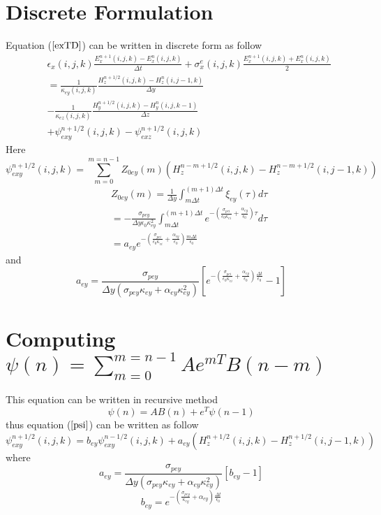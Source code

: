 \documentclass[a4paper,10pt]{article}
\begin{document}
\section{Discrete Formulation}
Equation ($\ref{exTD}$) can be written in discrete form as follow
\begin{eqnarray}
&&\epsilon_{x}(i,j,k)\frac{E^{n+1}_{x}(i,j,k)-E^{n}_{x}(i,j,k)}{\Delta t}
+\sigma^{e}_{x}(i,j,k)\frac{E^{n+1}_{x}(i,j,k)+E^{n}_{x}(i,j,k)}{2}\nonumber\\
&&=\frac{1}{\kappa_{e y}(i,j,k)}\frac{H^{n+1/2}_{z}(i,j,k)-H^{n}_{z}(i,j-1,k)}{\Delta y}\nonumber\\
&&-\frac{1}{\kappa_{e z}(i,j,k)}\frac{H^{n+1/2}_{y}(i,j,k)-H^{n}_{y}(i,j,k-1)}{\Delta z}\nonumber\\
&&+\psi^{n+1/2}_{e x y}(i,j,k)-\psi^{n+1/2}_{e x z}(i,j,k)
\end{eqnarray}
Here 
\begin{equation}\label{psi}
\psi^{n+1/2}_{e x y}(i,j,k)=\sum^{m=n-1}_{m=0}Z_{0 e y}(m)\left(H^{n-m+1/2}_{z}(i,j,k)-H^{n-m+1/2}_{z}(i,j-1,k)\right)
\end{equation}
\begin{eqnarray}
&&Z_{0 e y}(m)=\frac{1}{\Delta y}\int^{(m+1)\Delta t}_{m\Delta t}\xi_{e y}(\tau)d \tau\nonumber\\
&&=-\frac{\sigma_{p e y}}{\Delta y\epsilon_{0}\kappa^{2}_{e y}} \int^{(m+1)\Delta t}_{m\Delta t}e^{-\left(\frac{\sigma_{p e i}}{\epsilon_{0}\kappa_{e i}}+\frac{\alpha_{e y}}{\epsilon_{0}}\right)\tau}d \tau\nonumber\\
&&=a_{e y}e^{-\left(\frac{\sigma_{p e i}}{\epsilon_{0}\kappa_{e i}}+\frac{\alpha_{e y}}{\epsilon_{0}}\right)\frac{m \Delta t}{\epsilon_{0}}}
\end{eqnarray}
and
\begin{equation}
a_{e y}=\frac{\sigma_{p e y}}
{\Delta y \left(\sigma_{p e y}\kappa_{ey}+\alpha_{ey}\kappa^{2}_{e y}\right)}
\left[
e^{-
\left(
\frac{\sigma_{p e i}}{\epsilon_{0}\kappa_{e i}}
+\frac{\alpha_{e y}}{\epsilon_{0}}
\right)
\frac{\Delta t}{\epsilon_{0}}}-1\right]
\end{equation}
\section{Computing $\psi(n)=\sum^{m=n-1}_{m=0}A e^{m T}B(n-m) $}
This equation can be written in recursive method
\begin{equation}
\psi(n)=A B(n)+e^{T}\psi(n-1)
\end{equation}
thus equation ($\ref{psi}$) can be written as follow
\begin{equation}
\psi^{n+1/2}_{e x y}(i,j,k)=b_{ey}\psi^{n-1/2}_{e x y}(i,j,k)+
a_{e y}\left(H^{n+1/2}_{z}(i,j,k)-H^{n+1/2}_{z}(i,j-1,k)\right)
\end{equation}
where
\begin{equation}
a_{ey}=
\frac{\sigma_{pey}}
{
\Delta y 
\left(
\sigma_{pey}\kappa_{ey}
+\alpha_{ey}\kappa^{2}_{ey}
\right)}\left[b_{ey}-1\right]
\end{equation}
\begin{equation}
b_{ey}=e^{-\left(\frac{\sigma_{pey}}{\kappa_{ey}}+\alpha_{ey}\right)\frac{\Delta t}{\epsilon_{0}}}
\end{equation}
\end{document}
